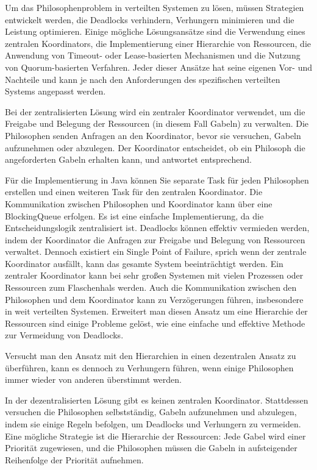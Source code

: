 Um das Philosophenproblem in verteilten Systemen zu lösen, müssen Strategien entwickelt werden, die Deadlocks verhindern, Verhungern minimieren und die Leistung optimieren. Einige mögliche Lösungsansätze sind die Verwendung eines zentralen Koordinators, die Implementierung einer Hierarchie von Ressourcen, die Anwendung von Timeout- oder Lease-basierten Mechanismen und die Nutzung von Quorum-basierten Verfahren. Jeder dieser Ansätze hat seine eigenen Vor- und Nachteile und kann je nach den Anforderungen des spezifischen verteilten Systems angepasst werden.

Bei der zentralisierten Lösung wird ein zentraler Koordinator verwendet, um die Freigabe und Belegung der Ressourcen (in diesem Fall Gabeln) zu verwalten. Die Philosophen senden Anfragen an den Koordinator, bevor sie versuchen, Gabeln aufzunehmen oder abzulegen. Der Koordinator entscheidet, ob ein Philosoph die angeforderten Gabeln erhalten kann, und antwortet entsprechend.

Für die Implementierung in Java können Sie separate Task für jeden Philosophen erstellen und einen weiteren Task für den zentralen Koordinator. Die Kommunikation zwischen Philosophen und Koordinator kann über eine BlockingQueue erfolgen.
Es ist eine einfache Implementierung, da die Entscheidungslogik zentralisiert ist. Deadlocks können effektiv vermieden werden, indem der Koordinator die Anfragen zur Freigabe und Belegung von Ressourcen verwaltet.
Dennoch existiert ein Single Point of Failure, sprich wenn der zentrale Koordinator ausfällt, kann das gesamte System beeinträchtigt werden.
Ein zentraler Koordinator kann bei sehr großen Systemen mit vielen Prozessen oder Ressourcen zum Flaschenhals werden. Auch die Kommunikation zwischen den Philosophen und dem Koordinator kann zu Verzögerungen führen, insbesondere in weit verteilten Systemen.
Erweitert man diesen Ansatz um eine Hierarchie der Ressourcen sind einige Probleme gelöst, wie eine einfache und effektive Methode zur Vermeidung von Deadlocks.

Versucht man den Ansatz mit den Hierarchien in einen dezentralen Ansatz zu überführen, kann es dennoch zu Verhungern führen, wenn einige Philosophen immer wieder von anderen überstimmt werden.

In der dezentralisierten Lösung gibt es keinen zentralen Koordinator. Stattdessen versuchen die Philosophen selbstständig, Gabeln aufzunehmen und abzulegen, indem sie einige Regeln befolgen, um Deadlocks und Verhungern zu vermeiden. Eine mögliche Strategie ist die Hierarchie der Ressourcen: Jede Gabel wird einer Priorität zugewiesen, und die Philosophen müssen die Gabeln in aufsteigender Reihenfolge der Priorität aufnehmen.


